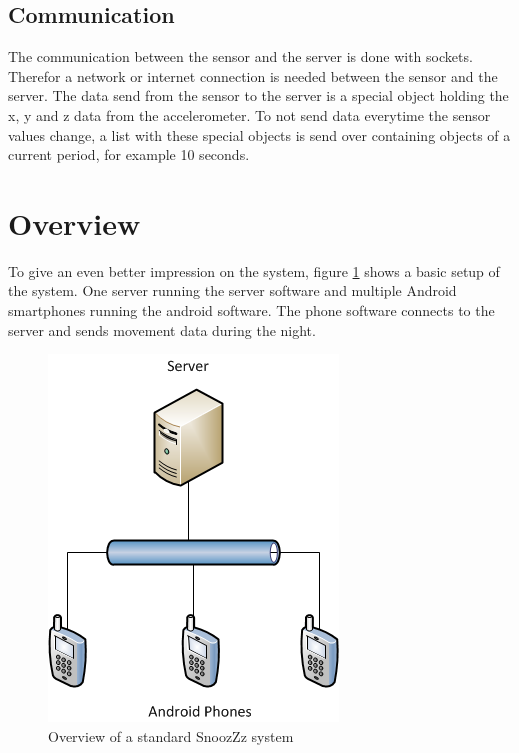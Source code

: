 \subsection{Communication} %
\label{sub:communication}
The communication between the sensor and the server is done with sockets. Therefor a network or internet connection is needed between the sensor and the server.
The data send from the sensor to the server is a special object holding the x, y and z data from the accelerometer. To not send data everytime the sensor values change, a list with these special objects is send over containing objects of a current period, for example 10 seconds.
\section{Overview} %
\label{sec:overview}
To give an even better impression on the system, figure \ref{fig:images_design_overview} shows a basic setup of the system. One server running the server software and multiple Android smartphones running the android software. The phone software connects to the server and sends movement data during the night.
\begin{figure}[htbp]
  \centering
    \includegraphics[width=.4\textwidth]{images/design_overview.png}
  \caption{Overview of a standard SnoozZz system}
  \label{fig:images_design_overview}
\end{figure}

